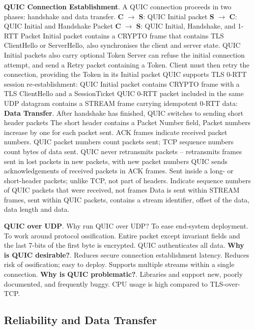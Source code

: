 \documentclass{article}
\begin{document}
\textbf{QUIC Connection Establishment}. A QUIC connection proceeds in two phases: handshake and data transfer.
\textbf{C} $\rightarrow$ \textbf{S}: QUIC Initial packet
\textbf{S} $\rightarrow$ \textbf{C}: QUIC Initial and Handshake Packet
\textbf{C} $\rightarrow$ \textbf{S}: QUIC Initial, Handshake, and 1-RTT Packet
Initial packet contains a CRYPTO frame that contains TLS ClientHello or ServerHello, also synchronises the client and server state.
QUIC Initial packets also carry optional Token Server can refuse the initial connection attempt,
and send a Retry packet containing a Token.
Client must then retry the connection, providing the Token in its Initial packet
QUIC supports TLS 0-RTT session re-establishment: QUIC Initial packet contains CRYPTO frame with a TLS ClientHello
and a SessionTicket QUIC 0-RTT packet included in the same UDP datagram contains a STREAM frame carrying idempotent 0-RTT data:
\textbf{Data Transfer}. After handshake has finished, QUIC switches to sending short header packets
The short header contains a Packet Number field, Packet numbers increase by one for each packet sent.
ACK frames indicate received packet numbers. QUIC packet numbers count packets sent; TCP sequence numbers count bytes of data sent.
QUIC never retransmits packets – retransmits frames sent in lost packets in new packets, with new packet numbers
QUIC sends acknowledgements of received packets in ACK frames.
Sent inside a long- or short-header packets; unlike TCP, not part of headers.
Indicate sequence numbers of QUIC packets that were received, not frames
Data is sent within STREAM frames, sent within QUIC packets, contains a stream identifier, offset of the data, data length and data.

\textbf{QUIC over UDP}. Why run QUIC over UDP? To ease end-system deployment.
To work around protocol ossification.
Entire packet except invariant fields and the last 7-bits of the first byte is encrypted.
QUIC authenticates all data.
\textbf{Why is QUIC desirable?}.
Reduces secure connection establishment latency.
Reduces risk of ossification; easy to deploy.
Supports multiple streams within a single connection.
\textbf{Why is QUIC problematic?}.
Libraries and support new, poorly documented, and frequently buggy.
CPU usage is high compared to TLS-over-TCP.


\subsection*{Reliability and Data Transfer}
\end{document}
